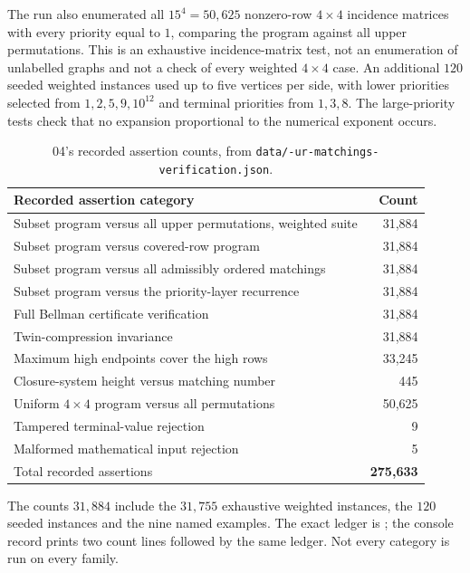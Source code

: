 \documentclass[11pt,a4paper]{article}
\theoremstyle{definition}
\theoremstyle{remark}
\begin{document}
The run also enumerated all $15^4=50{,}625$ nonzero-row $4\times4$ incidence
matrices with every priority equal to $1$, comparing the program against all
upper permutations. This is an exhaustive incidence-matrix test, not an
enumeration of unlabelled graphs and not a check of every weighted $4\times4$
case. An additional $120$ seeded weighted instances used up to five vertices
per side, with lower priorities selected from $1,2,5,9,10^{12}$ and terminal
priorities from $1,3,8$. The large-priority tests check that no expansion
proportional to the numerical exponent occurs.

\begin{table}[htbp]
\centering\small
\begin{tabularx}{\linewidth}{@{}Xr@{}}
\toprule
Recorded assertion category & Count\\
\midrule
Subset program versus all upper permutations, weighted suite & 31,884\\
Subset program versus covered-row program & 31,884\\
Subset program versus all admissibly ordered matchings & 31,884\\
Subset program versus the priority-layer recurrence & 31,884\\
Full Bellman certificate verification & 31,884\\
Twin-compression invariance & 31,884\\
Maximum high endpoints cover the high rows & 33,245\\
Closure-system height versus matching number & 445\\
Uniform $4\times4$ program versus all permutations & 50,625\\
Tampered terminal-value rejection & 9\\
Malformed mathematical input rejection & 5\\
\midrule
Total recorded assertions & \textbf{275,633}\\
\bottomrule
\end{tabularx}
\caption{04's recorded assertion counts, from
\texttt{data/-ur-matchings-verification.json}.}
\label{nh:ur:tab:assertions}
\end{table}
The counts $31{,}884$ include the $31{,}755$ exhaustive weighted instances,
the $120$ seeded instances and the nine named examples. The exact ledger is
; the console record
 prints two count lines
followed by the same ledger. Not every category is run on every family.
\end{document}
